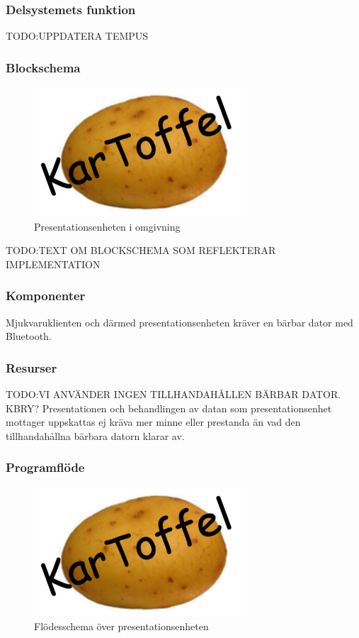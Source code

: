 \documentclass{article}
\begin{document}
\subsubsection{Delsystemets funktion}
TODO:UPPDATERA TEMPUS


\subsubsection{Blockschema}

\begin{figure}[H]
\includegraphics[scale=0.37]{Logo}
\caption{Presentationsenheten i omgivning}
\label{fig:Oversikt_presentationsenhet3}
\end{figure}

TODO:TEXT OM BLOCKSCHEMA SOM REFLEKTERAR IMPLEMENTATION

\subsubsection{Komponenter}
Mjukvaruklienten och därmed presentationsenheten kräver en bärbar dator med Bluetooth. 


\subsubsection{Resurser}
TODO:VI ANVÄNDER INGEN TILLHANDAHÅLLEN BÄRBAR DATOR. KBRY?
Presentationen och behandlingen av datan som presentationsenhet mottager uppskattas ej kräva mer minne eller prestanda än vad den tillhandahållna bärbara datorn klarar av.

\subsubsection{Programflöde}
\begin{figure}[H]
\centering 
\includegraphics[scale=0.3]{Logo}
\caption{Flödesschema över presentationsenheten}
\label{fig:Presentationsenhet3}
\end{figure}
\end{document}
